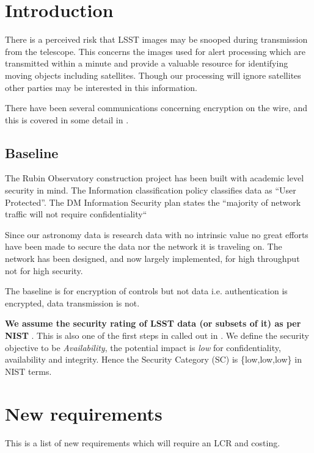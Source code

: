\section{Introduction} \label{sec:intro}

There is a perceived  risk that LSST  images may be snooped during transmission from the telescope. This concerns the images used for alert processing which are transmitted within a minute and provide a valuable resource for identifying moving objects including satellites. Though our processing will ignore satellites other parties may be interested in this information.

There have been several communications concerning encryption on the wire, and this is covered in some detail in .


\subsection{Baseline }
The Rubin Observatory construction project has been built with academic level security in mind.
The
 Information classification policy  classifies data as  “User Protected”.
The DM Information Security plan  states the “majority of network traffic will not require confidentiality“

Since our astronomy data is research data with no intrinsic value no great efforts have been made to secure the
data nor the network it is traveling on.
The network has been designed, and now largely implemented, for high throughput not for high security.

The baseline is for encryption of controls but not data i.e. authentication is encrypted, data transmission is not.

{\bf We assume the security rating of LSST data (or subsets of it) as per NIST }. This is also one of the first steps in  called out in .
We define the security objective to be \emph{Availability}, the potential impact is \emph{low} for confidentiality, availability and integrity. Hence the Security Category (SC) is \{low,low,low\} in NIST terms.


\section{New requirements}
This is a list of new requirements which will require an LCR and costing.

